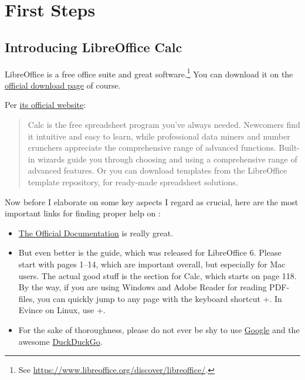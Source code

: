 \section{First Steps}
\label{sec:First-Steps}

\subsection{Introducing LibreOffice Calc}
\label{subsec:libreoffice-calc}

LibreOffice is a free office suite and great software.\footnote{See \href{https://www.libreoffice.org/discover/libreoffice/}{https://www.libreoffice.org/discover/libreoffice/}.}
You can download it on the  \href{https://www.libreoffice.org/download/download/}{official download page} of course.

Per \href{https://www.libreoffice.org/discover/calc/}{its official website}:
\begin{quote}\small
	Calc is the free spreadsheet program you've always needed. Newcomers find it intuitive and easy to learn, while professional data miners and number crunchers appreciate the comprehensive range of advanced functions. Built-in wizards guide you through choosing and using a comprehensive range of advanced features. Or you can download templates from the LibreOffice template repository, for ready-made spreadsheet solutions.
\end{quote}

Now before I elaborate on some key aspects I regard as crucial, here are the most important links for finding proper help on \loc:
\begin{itemize}
	\item \href{https://documentation.libreoffice.org/en/english-documentation/}{The Official Documentation} is really great.
	\item But even better is the  guide, which was released for LibreOffice 6.
	Please start with pages 1--14, which are important overall, but especially for Mac users.
	The actual good stuff is the section for Calc, which starts on page 118.
	By the way, if you are using Windows and Adobe Reader for reading PDF-files, you can quickly jump to any page with the keyboard shortcut +.
	In Evince on Linux, use +.
	\item For the sake of thoroughness, please do not ever be shy to use  \href{http://www.google.com}{Google} and the awesome \href{https://www.duckduckgo.com}{DuckDuckGo}.
\end{itemize}

